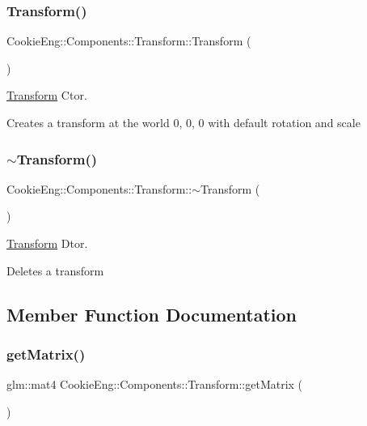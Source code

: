 \subsubsection{\texorpdfstring{Transform()}{Transform()}}
{\footnotesize\ttfamily Cookie\+Eng\+::\+Components\+::\+Transform\+::\+Transform (\begin{DoxyParamCaption}{ }\end{DoxyParamCaption})}



\hyperlink{class_cookie_eng_1_1_components_1_1_transform}{Transform} Ctor. 

Creates a transform at the world 0, 0, 0 with default rotation and scale \mbox{\label{class_cookie_eng_1_1_components_1_1_transform_ad07b4e7f04ec0c60646339be8b67c69c}} 
\subsubsection{\texorpdfstring{$\sim$\+Transform()}{~Transform()}}
{\footnotesize\ttfamily Cookie\+Eng\+::\+Components\+::\+Transform\+::$\sim$\+Transform (\begin{DoxyParamCaption}{ }\end{DoxyParamCaption})\hspace{0.3cm}{\ttfamily [inline]}}



\hyperlink{class_cookie_eng_1_1_components_1_1_transform}{Transform} Dtor. 

Deletes a transform 

\subsection{Member Function Documentation}
\mbox{\label{class_cookie_eng_1_1_components_1_1_transform_a0d18917e8701c84b6759823f785969de}} 
\subsubsection{\texorpdfstring{get\+Matrix()}{getMatrix()}}
{\footnotesize\ttfamily glm\+::mat4 Cookie\+Eng\+::\+Components\+::\+Transform\+::get\+Matrix (\begin{DoxyParamCaption}{ }\end{DoxyParamCaption})\hspace{0.3cm}{\ttfamily [inline]}}



